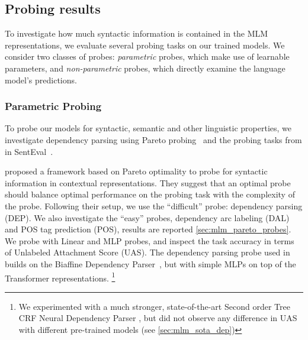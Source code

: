 \documentclass[letterpaper, 12pt]{report}
\begin{document}
\subsection{Probing results}
\label{sec:mlm_probing_results}

To investigate how much syntactic information is contained in the MLM representations, we evaluate several probing tasks on our trained models. We consider two classes of probes: \textit{parametric} probes, which make use of learnable parameters, and \textit{non-parametric} probes, which directly examine the language model's predictions.

\subsubsection{Parametric Probing}
\label{sec:mlm_param_probing}

To probe our models for syntactic, semantic and other linguistic properties, we investigate dependency parsing using Pareto probing~\cite{pimentel-etal-2020-pareto} and the probing tasks from \cite{conneau-etal-2018-cram} in SentEval~\cite{conneau-kiela-2018-senteval}.

\citet{pimentel-etal-2020-pareto} proposed a framework based on Pareto optimality to probe for syntactic information in contextual representations. They suggest that an optimal probe should balance optimal performance on the probing task with the complexity of the probe. Following their setup, we use the ``difficult'' probe: dependency parsing (DEP). We also investigate the ``easy'' probes, dependency arc labeling (DAL) and POS tag prediction (POS), results are reported \autoref{sec:mlm_pareto_probes}.
We probe with Linear and MLP probes, and inspect the task accuracy in terms of Unlabeled Attachment Score (UAS).
The dependency parsing probe used in \citet{pimentel-etal-2020-pareto} builds on the Biaffine Dependency Parser~\citep{dozat2016deep}, but with simple MLPs on top of the Transformer representations.%
\footnote{We experimented with a much stronger, state-of-the-art Second order Tree CRF Neural Dependency Parser \cite{zhang-etal-2020-efficient}, but did not observe any difference in UAS with different pre-trained models (see \autoref{sec:mlm_sota_dep})}
\end{document}
